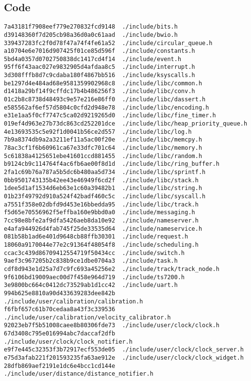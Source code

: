 \documentclass{article}
\begin{document}
\subsection{Code}
\begin{verbatim}
7a43181f7908eef779e270832fcd9148  ./include/bits.h
d39148360f7d205cb98a36d0a0c61aad  ./include/bwio.h
339437283fc2f0d78f47a74f4fe61a52  ./include/circular_queue.h
a10704e6e7016d907425f01ce85d596f  ./include/constants.h
5bd4a0357d0702750838dc1417cd4f14  ./include/event.h
95ff6f43aac027e9832905d4afdaa8c5  ./include/interrupt.h
3d308fffb8d7c9cdaba180f4867bb516  ./include/ksyscalls.h
be1297d4e484ad68e9581359902968c8  ./include/libc/common.h
d1418a29bf14f9cffdc17b4b486256f3  ./include/libc/conv.h
01c2b8c8738d48493c9e57e216e86ff0  ./include/libc/dassert.h
e585562af6ef57d5804c0cfd2d948e78  ./include/libc/encoding.h
e31e1aa5f0cf7747c5ca02d9219265d0  ./include/libc/fine_timer.h
019ef4d963e27b73dc863cd252201dce  ./include/libc/heap_priority_queue.h
4e13693535c5e92f1d0041b56ce2d557  ./include/libc/log.h
7b9a8374db9a2a3211ef11a5ac00f20e  ./include/libc/memcpy.h
78ac3cf1f6b60961ca67e33dfc701c64  ./include/libc/memory.h
5c61838a4125651ebe41601ccd881455  ./include/libc/random.h
b9124cb9c114764f4ac6fb6ae00f8d1d  ./include/libc/ring_buffer.h
2fa1c69b76a787a5b5dc6b480aa5d734  ./include/libc/sprintf.h
0bb9501743135b42ee43e46949f6cd2f  ./include/libc/stack.h
1dee5d1af1534d6eb63e1c60a39482b1  ./include/libc/string.h
01b23f49792d910a524f42badf460c5c  ./include/libc/syscall.h
a7551f358e02dbfd9d453e16bbedda95  ./include/libc/track.h
f5d65e70556962f5effba160e9bbd0a0  ./include/messaging.h
7cc98e8bfe2af9dfa5426aeb8da10e92  ./include/nameserver.h
e4afa944926d4fab745f25de33535d64  ./include/nameservice.h
081b58b1ad6e401d9648cb88ffb30301  ./include/request.h
18060a9170044e77e2c91364f48054f8  ./include/scheduling.h
ccac3c439d86709412554719f50434cc  ./include/switch.h
9aef3c967205b2c838b9ce1dbe0704a3  ./include/task.h
cdf8d943e1d25a7d7c9fc693a45256e2  ./include/track/track_node.h
9f6106bd19009aec00d7f458e964d719  ./include/ts7200.h
3e9800bc664c0412dc73529ab1d1cc42  ./include/uart.h
994b625e8810a90d433639283dee842b  ./include/user/calibration/calibration.h
f6fbf657c61b70cedaa8a43f3c339536  ./include/user/calibration/velocity_calibrator.h
92023eb7f5b51008caee8b80306fde73  ./include/user/clock/clock.h
67d3408c795e016994abc7daccaf2dfb  ./include/user/clock/clock_notifier.h
e9f7e445c32353f3b72917ecf553de05  ./include/user/clock/clock_server.h
e75d3afab221f201593235fa63ae912e  ./include/user/clock/clock_widget.h
28dfb869aef2191e1dc6e4bcc1cd144e  ./include/user/distance/distance_notifier.h

\end{verbatim}
\end{document}
